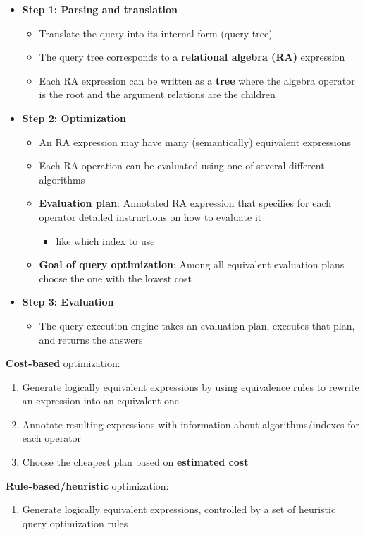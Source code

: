 \begin{itemize}[label=\(\rhd\)]
    \item \textbf{Step 1: Parsing and translation}
    \begin{itemize}[label=\(\rhd\)]
        \item Translate the query into its internal form (query tree)
        \item The query tree corresponds to a \textbf{relational algebra (RA)} expression
        \item Each RA expression can be written as a \textbf{tree} where the algebra operator is the root and the argument relations are the children
    \end{itemize}
    \item \textbf{Step 2: Optimization}
    \begin{itemize}[label=\(\rhd\)]
        \item An RA expression may have many (semantically) equivalent expressions
        \item Each RA operation can be evaluated using one of several different algorithms
        \item \textbf{Evaluation plan}: Annotated RA expression that specifies for each operator detailed instructions on how to evaluate it
        \begin{itemize}[label=\(\rhd\)]
            \item like which index to use
        \end{itemize}
        \item \textbf{Goal of query optimization}: Among all equivalent evaluation plans choose the one with the lowest cost
    \end{itemize}
    \item \textbf{Step 3: Evaluation}
    \begin{itemize}[label=\(\rhd\)]
        \item The query-execution engine takes an evaluation plan, executes that plan, and returns the answers
    \end{itemize}
\end{itemize}

\textbf{Cost-based} optimization:
\begin{enumerate}
    \item Generate logically equivalent expressions by using equivalence rules to rewrite an expression into an equivalent one
    \item Annotate resulting expressions with information about algorithms/indexes for each operator
    \item Choose the cheapest plan based on \textbf{estimated cost}
\end{enumerate}
\textbf{Rule-based/heuristic} optimization:
\begin{enumerate}
    \item Generate logically equivalent expressions, controlled by a set of heuristic query optimization rules
\end{enumerate}

